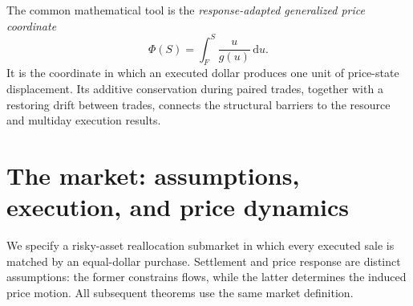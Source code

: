 \documentclass[11pt]{article}
\numberwithin{equation}{section}
\theoremstyle{definition}
\theoremstyle{remark}
\newcommand{\dd}{\,\mathrm{d}}
\begin{document}
The common mathematical tool is the \emph{response-adapted generalized price coordinate}
\begin{equation}\label{eq:phi-intro}
\Phi(S)=\int_F^S\frac{u}{g(u)}\dd u.
\end{equation}
It is the coordinate in which an executed dollar produces one unit of price-state displacement. Its additive conservation during paired trades, together with a restoring drift between trades, connects the structural barriers to the resource and multiday execution results.

\section{The market: assumptions, execution, and price dynamics}\label{sec:micro}\label{sec:model}
We specify a risky-asset reallocation submarket in which every executed sale is matched by an equal-dollar purchase. Settlement and price response are distinct assumptions: the former constrains flows, while the latter determines the induced price motion. All subsequent theorems use the same market definition.
\end{document}
